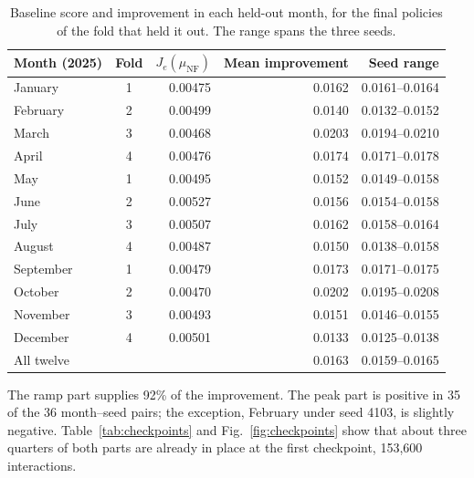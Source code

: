 \documentclass{UNCC-thesis}
\begin{document}
\begin{table}[htbp]
  \centering
  \footnotesize
  \caption{Baseline score and improvement in each held-out month, for the
  final policies of the fold that held it out. The range spans the three
  seeds.}
  \label{tab:months}
  \begin{tabular}{@{}lcrrr@{}}
    \toprule
    Month (2025) & Fold & \(J_e(\mu_{\mathrm{NF}})\) & Mean improvement & Seed range \\
    \midrule
    January   & 1 & 0.00475 & 0.0162 & 0.0161--0.0164 \\
    February  & 2 & 0.00499 & 0.0140 & 0.0132--0.0152 \\
    March     & 3 & 0.00468 & 0.0203 & 0.0194--0.0210 \\
    April     & 4 & 0.00476 & 0.0174 & 0.0171--0.0178 \\
    May       & 1 & 0.00495 & 0.0152 & 0.0149--0.0158 \\
    June      & 2 & 0.00527 & 0.0156 & 0.0154--0.0158 \\
    July      & 3 & 0.00507 & 0.0162 & 0.0158--0.0164 \\
    August    & 4 & 0.00487 & 0.0150 & 0.0138--0.0158 \\
    September & 1 & 0.00479 & 0.0173 & 0.0171--0.0175 \\
    October   & 2 & 0.00470 & 0.0202 & 0.0195--0.0208 \\
    November  & 3 & 0.00493 & 0.0151 & 0.0146--0.0155 \\
    December  & 4 & 0.00501 & 0.0133 & 0.0125--0.0138 \\
    \midrule
    All twelve &   &         & 0.0163 & 0.0159--0.0165 \\
    \bottomrule
  \end{tabular}
\end{table}

The ramp part supplies 92\% of the improvement. The peak part is positive in
35 of the 36 month--seed pairs; the exception, February under seed 4103, is
slightly negative. Table~\ref{tab:checkpoints} and
Fig.~\ref{fig:checkpoints} show that about three quarters of both parts are
already in place at the first checkpoint, 153,600 interactions.
\end{document}
